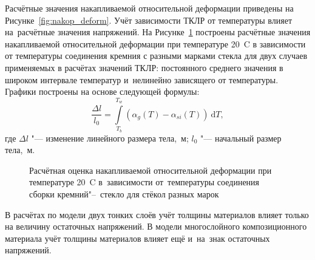 Расчётные значения накапливаемой относительной деформации приведены на
Рисунке~\ref{fig:nakop_deform}.
Учёт зависимости ТКЛР от
температуры влияет на~расчётные значения напряжений.
На Рисунке~\ref{fig:nakop_deform_xtb} построены расчётные значения
накапливаемой относительной деформации при температуре
20~{\textdegree}C в зависимости от температуры соединения кремния с
разными марками стекла для двух случаев применяемых в расчётах
значений ТКЛР: постоянного среднего значения в широком интервале температур
и~нелинейно зависящего от температуры.
Графики построены на основе следующей формулы:
\begin{equation*}
    \label{eq:nakop_deform}
    \frac {\Delta l}{l_0}
    =
    \int\limits_{T_b}^{T_w}
    (
         \alpha_g(T) - \alpha_{si}(T)
    )
    \:\mathrm{d}T,
\end{equation*}
где \(\Delta l\) "--- изменение линейного размера тела,~м;
\(l_0\) "--- начальный размер тела,~м.

\begin{figure}[!ht]%
    \centering
    \caption{Расчётная оценка накапливаемой относительной деформации при температуре 20~{\textdegree}C в~зависимости от~температуры соединения сборки кремний"--~стекло для стёкол разных марок}%
    \label{fig:nakop_deform_xtb}%
\end{figure}

В расчётах по модели двух
тонких слоёв учёт толщины материалов влияет только на величину
остаточных напряжений. В модели
многослойного композиционного материала учёт толщины материалов влияет
ещё и~на~знак остаточных напряжений.

